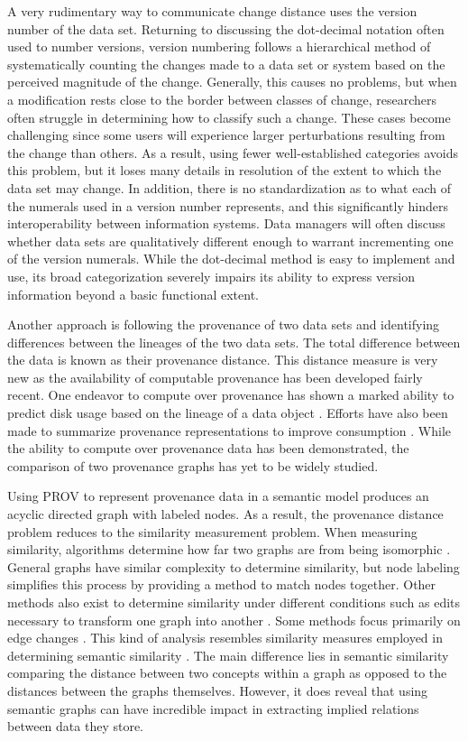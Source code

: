 A very rudimentary way to communicate change distance uses the version number of the data set.
Returning to discussing the dot-decimal notation often used to number versions, version numbering follows a hierarchical method of systematically counting the changes made to a data set or system based on the perceived magnitude of the change.
Generally, this causes no problems, but when a modification rests close to the border between classes of change, researchers often struggle in determining how to classify such a change.
These cases become challenging since some users will experience larger perturbations resulting from the change than others.
As a result, using fewer well-established categories avoids this problem, but it loses many details in resolution of the extent to which the data set may change.
In addition, there is no standardization as to what each of the numerals used in a version number represents, and this significantly hinders interoperability between information systems.
Data managers will often discuss whether data sets are qualitatively different enough to warrant incrementing one of the version numerals.
While the dot-decimal method is easy to implement and use, its broad categorization severely impairs its ability to express version information beyond a basic functional extent.

Another approach is following the provenance of two data sets and identifying  differences between the lineages of the two data sets.
The total difference between the data is known as their provenance distance.
This distance measure is very new as the availability of computable provenance has been developed fairly recent.
One endeavor to compute over provenance has shown a marked ability to predict disk usage based on the lineage of a data object \cite{dai2014provenance}.
Efforts have also been made to summarize provenance representations to improve consumption \cite{Ainy:2015:ASD:2806416.2806429}.
While the ability to compute over provenance data has been demonstrated, the comparison of two provenance graphs has yet to be widely studied.

Using PROV to represent provenance data in a semantic model produces an acyclic directed graph with labeled nodes.
As a result, the provenance distance problem reduces to the similarity measurement problem.
When measuring similarity, algorithms determine how far two graphs are from being isomorphic \cite{Cao2013}.
General graphs have similar complexity to determine similarity, but node labeling simplifies this process by providing a method to match nodes together.
Other methods also exist to determine similarity under different conditions such as edits necessary to transform one graph into another  \cite{Gao2010}.
Some methods focus primarily on edge changes \cite{Goddard:1996:DGU:246962.246972}.
This kind of analysis resembles similarity measures employed in determining semantic similarity \cite{Hliaoutakis06informationretrieval}.
The main difference lies in semantic similarity comparing the distance between two concepts within a graph as opposed to the distances between the graphs themselves.
However, it does reveal that using semantic graphs can have incredible impact in extracting implied relations between data they store.

